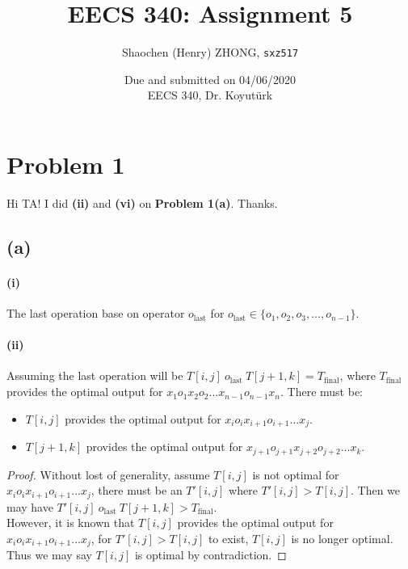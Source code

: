 \documentclass[11pt]{article}
\newcommand{\ilc}{\texttt}
\begin{document}
\title{\textbf{EECS 340: Assignment 5}}

\author{Shaochen (Henry) ZHONG, \ilc{sxz517}}
\date{Due and submitted on 04/06/2020 \\ EECS 340, Dr. Koyut{\"u}rk}
\maketitle

\section{Problem 1}

Hi TA! I did \textbf{(ii)} and \textbf{(vi)} on \textbf{Problem 1(a)}. Thanks.
\subsection{(a)}

\paragraph{(i)}

The last operation base on operator $o_{\text{last}}$ for $o_{\text{last}} \in \{o_1, o_2, o_3, ..., o_{n-1}\}$.

\paragraph{(ii)} Assuming the last operation will be $T[i, j] \ o_{\text{last}} \ T[j+1, k] = T_{\text{final}}$, where $T_{\text{final}}$ provides the optimal output for $x_1 o_1 x_2 o_2 ... x_{n-1} o_{n-1} x_n$. There must be:


\begin{itemize}
    \item $T[i, j]$ provides the optimal output for $x_i o_i x_{i+1} o_{i+1} ... x_{j}$.
    \item $T[j+1, k]$ provides the optimal output for $x_{j+1} o_{j+1} x_{j+2} o_{j+2} ... x_{k}$.
\end{itemize}

\begin{proof}
    Without lost of generality, assume $T[i, j]$ is not optimal for $x_i o_i x_{i+1} o_{i+1} ... x_{j}$, there must be an $T'[i, j]$ where $T'[i, j] > T[i,j]$. Then we may have $T'[i, j] \ o_{\text{last}} \ T[j+1, k] > T_{\text{final}}$. \\
    However, it is known that $T[i, j]$ provides the optimal output for $x_i o_i x_{i+1} o_{i+1} ... x_{j}$, for $T'[i, j] > T[i,j]$ to exist,  $T[i, j]$ is no longer optimal. Thus we may say $T[i, j]$ is optimal by contradiction.
\end{proof}
\end{document}
